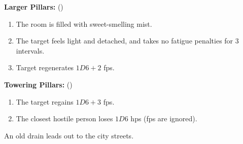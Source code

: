 \textbf{Larger Pillars:} (\tn[10])

\begin{enumerate}
  \item
  The room is filled with sweet-smelling mist.
  \item
  The target feels light and detached, and takes no \gls{fatigue} penalties for 3 \glspl{interval}.
  \item
  Target regenerates $1D6+2$ \glspl{fp}.
\end{enumerate}

\textbf{Towering Pillars:} (\tn[12])

\begin{enumerate}
  \item
  The target regains $1D6+3$ \glspl{fp}.
  \item
  The closest hostile person loses $1D6$ \glspl{hp} (\glspl{fp} are ignored).
\end{enumerate}

\label{slum_exit}

An old drain leads out to the city streets.


